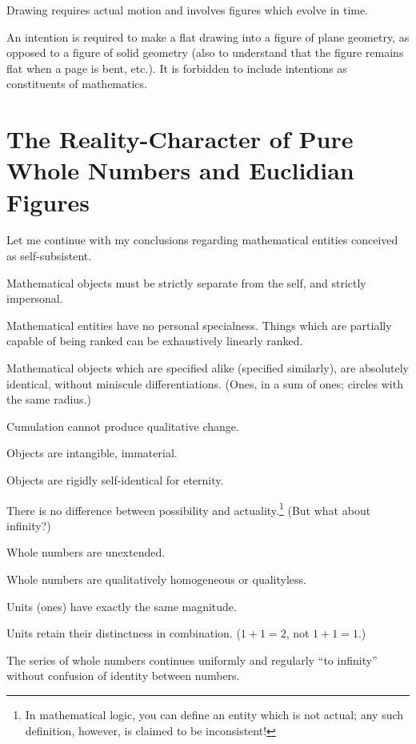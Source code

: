 Drawing requires actual motion and involves figures which evolve in time.

An intention is required to make a flat drawing into a figure of plane geometry, as opposed to a figure of solid geometry (also to understand that the figure remains flat when a page is bent, etc.). It is forbidden to include intentions as constituents of mathematics.

\jarule

\section{The Reality-Character of Pure Whole Numbers and Euclidian Figures}

Let me continue with my conclusions regarding mathematical entities conceived as self-subsistent.

 Mathematical objects must be strictly separate from the self, and strictly impersonal.

Mathematical entities have no personal specialness. Things which are partially capable of being ranked can be exhaustively linearly ranked.

Mathematical objects which are specified alike (specified similarly), are absolutely identical, without miniscule differentiations. (Ones, in a sum of ones; circles with the same radius.)

Cumulation cannot produce qualitative change.

Objects are intangible, immaterial.

Objects are rigidly self-identical for eternity.

There is no difference between possibility and actuality.\footnote{In mathematical logic, you can define an entity which is not actual; any such definition, however, is claimed to be inconsistent!} (But what about infinity?)

 Whole numbers are unextended.

Whole numbers are qualitatively homogeneous or qualityless.

Units (ones) have exactly the same magnitude.

Units retain their distinctness in combination. ($1+1=2$, not $1+1=1$.)

The series of whole numbers continues uniformly and regularly \enquote{to infinity} without confusion of identity between numbers.

